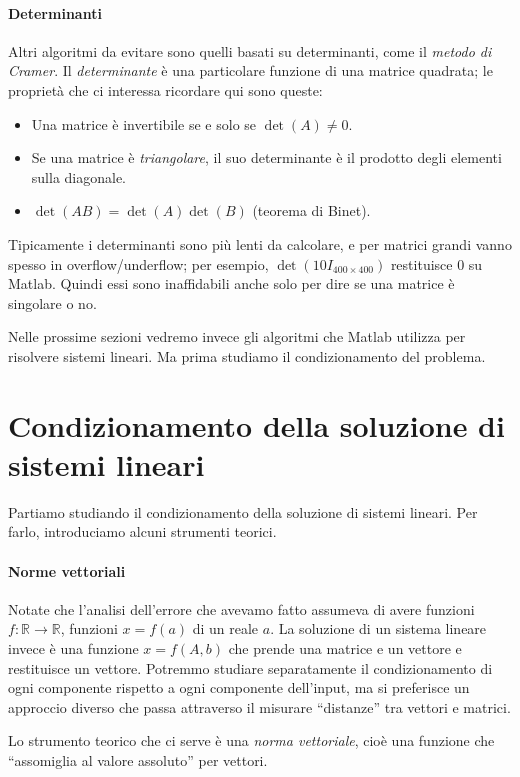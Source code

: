 \documentclass[a4paper]{report}
\theoremstyle{definiton}
\theoremstyle{remark}
\begin{document}
\paragraph{Determinanti} Altri algoritmi da evitare sono quelli basati su determinanti, come il \emph{metodo di Cramer}. Il \emph{determinante} è una particolare funzione di una matrice quadrata; le proprietà che ci interessa ricordare qui sono queste:
\begin{itemize}
    \item Una matrice è invertibile se e solo se $\det(A) \neq 0$.
    \item Se una matrice è \emph{triangolare}, il suo determinante è il prodotto degli elementi sulla diagonale.
    \item $\det(AB) = \det(A) \det(B)$ (teorema di Binet).
\end{itemize}
Tipicamente i determinanti sono più lenti da calcolare, e per matrici grandi vanno spesso in overflow/underflow; per esempio, $\det(10 I_{400\times 400})$ restituisce $0$ su Matlab. Quindi essi sono inaffidabili anche solo per dire se una matrice è singolare o no. 

Nelle prossime sezioni vedremo invece gli algoritmi che Matlab utilizza per risolvere sistemi lineari. Ma prima studiamo il condizionamento del problema.

\section{Condizionamento della soluzione di sistemi lineari}

Partiamo studiando il condizionamento della soluzione di sistemi lineari. Per farlo, introduciamo alcuni strumenti teorici.

\paragraph{Norme vettoriali} Notate che l'analisi dell'errore che avevamo fatto assumeva di avere funzioni $f: \mathbb{R} \to \mathbb{R}$, funzioni $x=f(a)$ di un reale $a$. La soluzione di un sistema lineare invece è una funzione $x = f(A,b)$ che prende una matrice e un vettore e restituisce un vettore. Potremmo studiare separatamente il condizionamento di ogni componente rispetto a ogni componente dell'input, ma si preferisce un approccio diverso che passa attraverso il misurare ``distanze'' tra vettori e matrici.

Lo strumento teorico che ci serve è una \emph{norma vettoriale}, cioè una funzione che ``assomiglia al valore assoluto'' per vettori.
\end{document}
